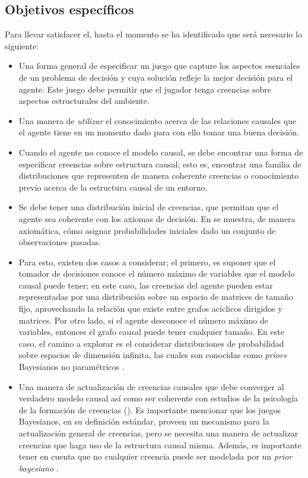 \documentclass[11pt]{article}
\theoremstyle{plain}
\begin{document}
	\subsection{Objetivos específicos}
	Para llevar satisfacer el, hasta el momento se ha identificado que será necesario lo siguiente:
\begin{itemize}
\item Una forma general de especificar un juego que capture los aspectos esenciales de un problema de decisión y cuya solución refleje la mejor decisión para el agente. Este juego debe permitir que el jugador tenga creencias sobre aspectos estructurales del ambiente. 

\item Una manera de \textit{utilizar} el conocimiento acerca de las relaciones causales que el agente tiene en un momento dado para con ello tomar una buena decisión.

\item Cuando el agente no conoce el modelo causal, se debe encontrar una forma de especificar creencias sobre estructura causal; esto es, encontrar una familia de distribuciones que representen de manera coherente creencias o conocimiento previo acerca de la estructura causal de un entorno. 

\item Se debe tener una distribución inicial de creencias, que permitan que el agente sea coherente con los axiomas de decisión. En \cite{billot2005probabilities} se muestra, de manera axiomática, cómo asignar probabilidades iniciales dado un conjunto de observaciones pasadas.\\

\item Para esto, existen dos casos a considerar; el primero, es suponer que el tomador de decisiones conoce el número máximo de variables que el modelo causal puede tener; en este caso, las creencias del agente pueden estar representadas por una distribución sobre un espacio de matrices de tamaño fijo, aprovechando la relación que existe entre grafos acíclicos dirigidos y matrices. Por otro lado, si el agente desconoce el número máximo de variables, entonces el grafo causal puede tener cualquier tamaño. En este caso, el camino a explorar es el considerar distribuciones de probabilidad sobre espacios de dimensión infinita, las cuales son conocidas como \textit{priors} Bayesianos no paramétricos \cite{ghosal2017fundamentals}. 

\item Una manera de actualización de creencias causales que debe converger al verdadero modelo causal así como ser coherente con estudios de la psicología de la formación de creencias (\cite{larrouy2017mindreading}). Es importante mencionar que los juegos Bayesianos, en su definición estándar, proveen un mecanismo para la actualización general de creencias, pero se necesita una manera de actualizar creencias que haga uso de la estructura causal misma. Además, es importante tener en cuenta que no cualquier creencia puede ser modelada por un \textit{prior bayesiano} \cite{gilboa2016ambiguity}.


\end{itemize}
\end{document}
